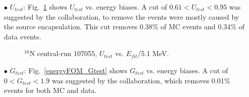 \begin{itemize}
\item[$\bullet$]$U_{test}$:
Fig.~\ref{energyFOM_Utest} shows $U_{test}$ vs. energy biases. A cut of $0.61<U_{test}<0.95$ was suggested by the collaboration, to remove the events were mostly caused by the source encapsulation. This cut removes 0.38\% of MC events and 0.34\% of data events.
\begin{figure}[!htb]
	\centering
	\caption{$^{16}$N central-run 107055, $U_{test}$ vs. $E_{fit}$/5.1 MeV.}
	\label{energyFOM_Utest}
\end{figure}

\item[$\bullet$] $G_{test}$: Fig.~\ref{energyFOM_Gtest} shows $G_{test}$ vs. energy biases. A cut of $0<G_{test}<1.9$ was suggested by the collaboration, which removes 0.01\% events for both MC and data.	
	

\end{itemize}
